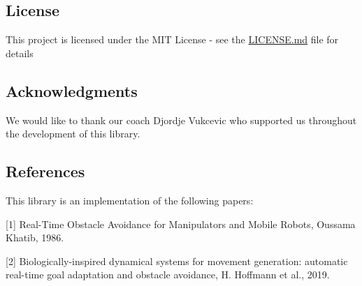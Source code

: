 \subsection*{License}

This project is licensed under the M\+IT License -\/ see the \hyperlink{md_LICENSE}{L\+I\+C\+E\+N\+SE.md} file for details

\subsection*{Acknowledgments}


\begin{DoxyItemize}
\item We would like to thank our coach Djordje Vukcevic who supported us throughout the development of this library.
\end{DoxyItemize}

\subsection*{References}

This library is an implementation of the following papers\+:


\begin{DoxyItemize}
\item \mbox{[}1\mbox{]} Real-\/\+Time Obstacle Avoidance for Manipulators and Mobile Robots, Oussama Khatib, 1986.
\item \mbox{[}2\mbox{]} Biologically-\/inspired dynamical systems for movement generation\+: automatic real-\/time goal adaptation and obstacle avoidance, H. Hoffmann et al., 2019. 
\end{DoxyItemize}